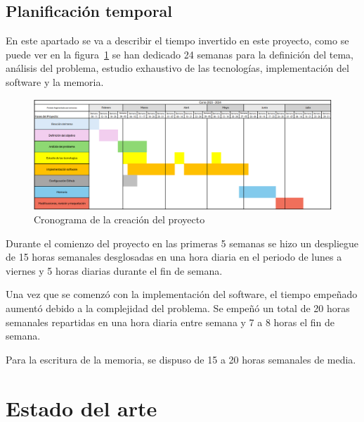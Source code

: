\documentclass[a4paper, 12pt]{book}
\begin{document}
\section{Planificación temporal}
\label{sec:planificacion-temporal}

En este apartado se va a describir el tiempo invertido en este proyecto, como se puede ver en la figura~\ref{fig:cronograma} se han dedicado 24 semanas para la definición del tema, análisis del problema, estudio exhaustivo de las tecnologías, implementación del software y la memoria.

\begin{figure}[h]
  \centering
  \includegraphics[width=16cm, keepaspectratio]{img/cronograma.png}
  \caption{Cronograma de la creación del proyecto}
  \label{fig:cronograma}
\end{figure}

Durante el comienzo del proyecto en las primeras 5 semanas se hizo un despliegue de 15 horas semanales desglosadas en una hora diaria en el periodo de lunes a viernes y 5 horas diarias durante el fin de semana.

Una vez que se comenzó con la implementación del software, el tiempo empeñado aumentó debido a la complejidad del problema. Se empeñó un total de 20 horas semanales repartidas en una hora diaria entre semana y 7 a 8 horas el fin de semana.

Para la escritura de la memoria, se dispuso de 15 a 20 horas semanales de media.


\cleardoublepage
\chapter{Estado del arte}
\label{chap:estado}
\end{document}
